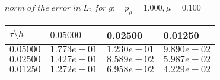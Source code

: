 
 $norm\;of\;the\;error\;in\;L_2\;for\;g: \quad p_{\rho}=1.000, \mu = 0.100 $ \\ 
\begin{tabular}{|p{0.6in}|p{1.2in}|p{1.2in}|p{1.2in}|} \hline
$\tau\setminus h$ & $0.05000 $ & 0.02500 & 0.01250 \\ \hline
$0.05000$ & $1.773e-01$ &$1.230e-01$ &$9.890e-02$  \\ \hline
$0.02500$ & $1.427e-01$ &$8.589e-02$ &$5.987e-02$  \\ \hline
$0.01250$ & $1.272e-01$ &$6.958e-02$ &$4.229e-02$  \\ \hline
\end{tabular}\\[20pt]
